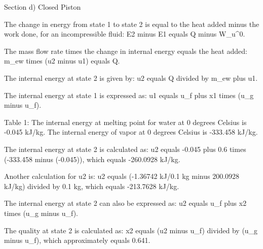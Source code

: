 Section d) Closed Piston

The change in energy from state 1 to state 2 is equal to the heat added minus the work done, for an incompressible fluid:
E2 minus E1 equals Q minus W_u^0.

The mass flow rate times the change in internal energy equals the heat added:
m_ew times (u2 minus u1) equals Q.

The internal energy at state 2 is given by:
u2 equals Q divided by m_ew plus u1.

The internal energy at state 1 is expressed as:
u1 equals u_f plus x1 times (u_g minus u_f).

Table 1:
The internal energy at melting point for water at 0 degrees Celsius is -0.045 kJ/kg.
The internal energy of vapor at 0 degrees Celsius is -333.458 kJ/kg.

The internal energy at state 2 is calculated as:
u2 equals -0.045 plus 0.6 times (-333.458 minus (-0.045)),
which equals -260.0928 kJ/kg.

Another calculation for u2 is:
u2 equals (-1.36742 kJ/0.1 kg minus 200.0928 kJ/kg) divided by 0.1 kg,
which equals -213.7628 kJ/kg.

The internal energy at state 2 can also be expressed as:
u2 equals u_f plus x2 times (u_g minus u_f).

The quality at state 2 is calculated as:
x2 equals (u2 minus u_f) divided by (u_g minus u_f),
which approximately equals 0.641.